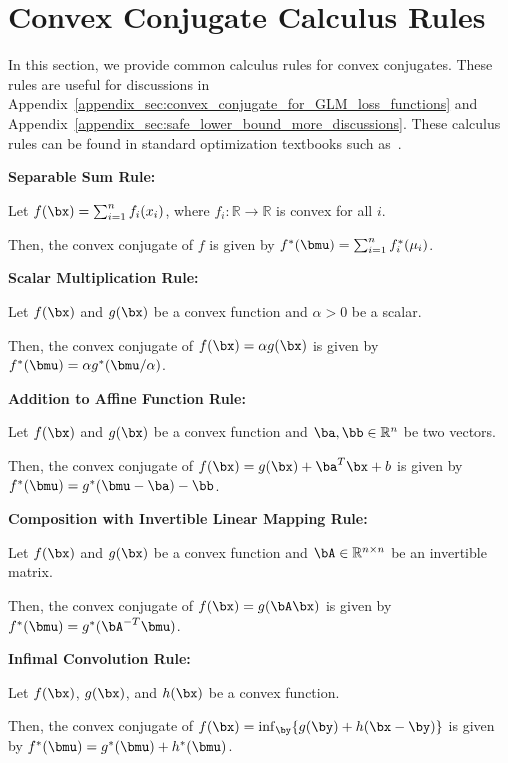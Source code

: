 \section{Convex Conjugate Calculus Rules}
\label{appendix_sec:convex_conjugate_calculus_rules}

In this section, we provide common calculus rules for convex conjugates.
These rules are useful for discussions in Appendix~\ref{appendix_sec:convex_conjugate_for_GLM_loss_functions} and Appendix~\ref{appendix_sec:safe_lower_bound_more_discussions}.
These calculus rules can be found in standard optimization textbooks such as~\cite{}.

\textbf{Separable Sum Rule:} 

Let $f(\bx) = \sum_{i=1}^n f_i(x_i)$, where $f_i: \mathbb{R} \rightarrow \mathbb{R}$ is convex for all $i$.

Then, the convex conjugate of $f$ is given by $f^*(\bmu) = \sum_{i=1}^n f_i^*(\mu_i)$.

\textbf{Scalar Multiplication Rule:} 

Let $f(\bx)$ and $g(\bx)$ be a convex function and $\alpha > 0$ be a scalar.

Then, the convex conjugate of $f(\bx) = \alpha g(\bx)$ is given by $f^*(\bmu) = \alpha g^*(\bmu/\alpha)$.



\textbf{Addition to Affine Function Rule:} 

Let $f(\bx)$ and $g(\bx)$ be a convex function and $\ba, \bb \in \mathbb{R}^n$ be two vectors.

Then, the convex conjugate of $f(\bx) = g(\bx) + \ba^T\bx + b$ is given by $f^*(\bmu) = g^*(\bmu - \ba) - \bb$.


\textbf{Composition with Invertible Linear Mapping Rule:} 

Let $f(\bx)$ and $g(\bx)$ be a convex function and $\bA \in \mathbb{R}^{n \times n}$ be an invertible matrix.

Then, the convex conjugate of $f(\bx) = g(\bA \bx)$ is given by $f^*(\bmu) = g^*(\bA^{-T} \bmu)$.

\textbf{Infimal Convolution Rule:} 

Let $f(\bx)$, $g(\bx)$, and $h(\bx)$ be a convex function.

Then, the convex conjugate of $f(\bx) = \inf_{\by} \{g(\by) + h(\bx - \by)\}$ is given by $f^*(\bmu) = g^*(\bmu) + h^*(\bmu)$.
